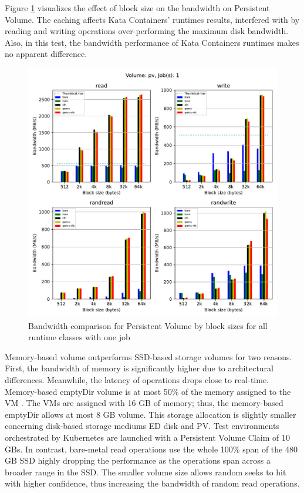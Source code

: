 Figure \ref{fig:ResultsPVByBS-1} visualizes the effect of block size on the bandwidth on Persistent Volume. The caching affects Kata Containers' runtimes results, interfered with by reading and writing operations over-performing the maximum disk bandwidth. Also, in this test, the bandwidth performance of Kata Containers runtimes makes no apparent difference.


\begin{figure}[ht]
  \begin{center}
    \includegraphics[width=12cm]{results/subplot_bw_by_bs_with_bare(pv,1).pdf}
    \caption{Bandwidth comparison for Persistent Volume by block sizes for all runtime classes with one job}
    \label{fig:ResultsPVByBS-1}
  \end{center}
\end{figure}

Memory-based volume outperforms SSD-based storage volumes for two reasons. First, the bandwidth of memory is significantly higher due to architectural differences. Meanwhile, the latency of operations drops close to real-time. Memory-based emptyDir volume is at most 50\% of the memory assigned to the VM \cite{VolumesKubernetes}. The VMs are assigned with 16 GB of memory; thus, the memory-based emptyDir allows at most 8 GB volume. This storage allocation is slightly smaller concerning disk-based storage mediums ED disk and PV. Test environments orchestrated by Kubernetes are launched with a Persistent Volume Claim of 10 GBs. In contrast, bare-metal read operations use the whole 100\% span of the 480 GB SSD \cite{IntelSSD} highly dropping the performance as the operations span across a broader range in the SSD. The smaller volume size allows random seeks to hit with higher confidence, thus increasing the bandwidth of random read operations.


